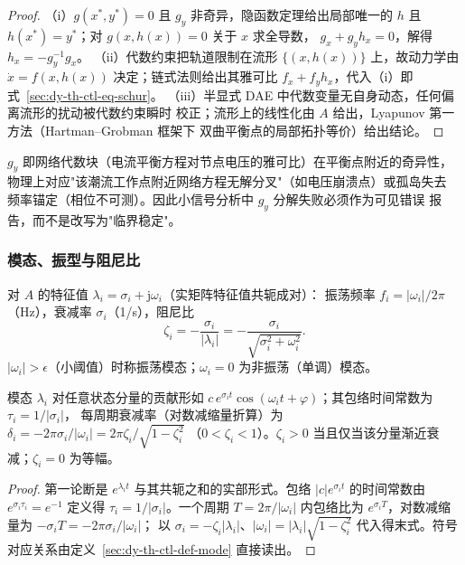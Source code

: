 \begin{proof}
（i）$g(x^*,y^*)=0$ 且 $g_y$ 非奇异，隐函数定理给出局部唯一的 $h$ 且
$h(x^*)=y^*$；对 $g(x,h(x))=0$ 关于 $x$ 求全导数，
$g_x+g_y h_x=0$，解得 $h_x=-g_y^{-1}g_x$。
（ii）代数约束把轨道限制在流形 $\{(x,h(x))\}$ 上，故动力学由 $\dot x=f(x,h(x))$
决定；链式法则给出其雅可比 $f_x+f_yh_x$，代入（i）即
式~\eqref{sec:dy-th-ctl-eq-schur}。
（iii）半显式 DAE 中代数变量无自身动态，任何偏离流形的扰动被代数约束瞬时
校正；流形上的线性化由 $A$ 给出，Lyapunov 第一方法（Hartman--Grobman 框架下
双曲平衡点的局部拓扑等价）给出结论。
\end{proof}

\begin{remark}[$g_y$ 奇异的物理含义]
$g_y$ 即网络代数块（电流平衡方程对节点电压的雅可比）在平衡点附近的奇异性，
物理上对应"该潮流工作点附近网络方程无解分叉"（如电压崩溃点）或孤岛失去
频率锚定（相位不可测）。因此小信号分析中 $g_y$ 分解失败必须作为可见错误
报告，而不是改写为"临界稳定"。
\end{remark}

\subsubsection{模态、振型与阻尼比}

\begin{definition}[模态特征量]\label{sec:dy-th-ctl-def-mode}
对 $A$ 的特征值 $\lambda_i=\sigma_i+\mathrm j\omega_i$（实矩阵特征值共轭成对）：
振荡频率 $f_i=|\omega_i|/2\pi$（Hz），衰减率 $\sigma_i$（1/s），阻尼比
\begin{equation}
\zeta_i=-\frac{\sigma_i}{|\lambda_i|}=-\frac{\sigma_i}{\sqrt{\sigma_i^2+\omega_i^2}}.
\label{sec:dy-th-ctl-eq-zeta}
\end{equation}
$|\omega_i|>\epsilon$（小阈值）时称振荡模态；$\omega_i=0$ 为非振荡（单调）模态。
\end{definition}

\begin{proposition}[阻尼比与包络衰减]\label{sec:dy-th-ctl-prop-env}
模态 $\lambda_i$ 对任意状态分量的贡献形如
$c\,e^{\sigma_i t}\cos(\omega_i t+\varphi)$；其包络时间常数为 $\tau_i=1/|\sigma_i|$，
每周期衰减率（对数减缩量折算）为
$\delta_i=-2\pi\sigma_i/|\omega_i|=2\pi\zeta_i/\sqrt{1-\zeta_i^2}$
（$0<\zeta_i<1$）。$\zeta_i>0$ 当且仅当该分量渐近衰减；$\zeta_i=0$ 为等幅。
\end{proposition}

\begin{proof}
第一论断是 $e^{\lambda_i t}$ 与其共轭之和的实部形式。包络
$|c|e^{\sigma_i t}$ 的时间常数由 $e^{\sigma_i\tau_i}=e^{-1}$ 定义得
$\tau_i=1/|\sigma_i|$。一个周期 $T=2\pi/|\omega_i|$ 内包络比为
$e^{\sigma_i T}$，对数减缩量为 $-\sigma_iT=-2\pi\sigma_i/|\omega_i|$；
以 $\sigma_i=-\zeta_i|\lambda_i|$、$|\omega_i|=|\lambda_i|\sqrt{1-\zeta_i^2}$
代入得末式。符号对应关系由定义~\ref{sec:dy-th-ctl-def-mode} 直接读出。
\end{proof}

